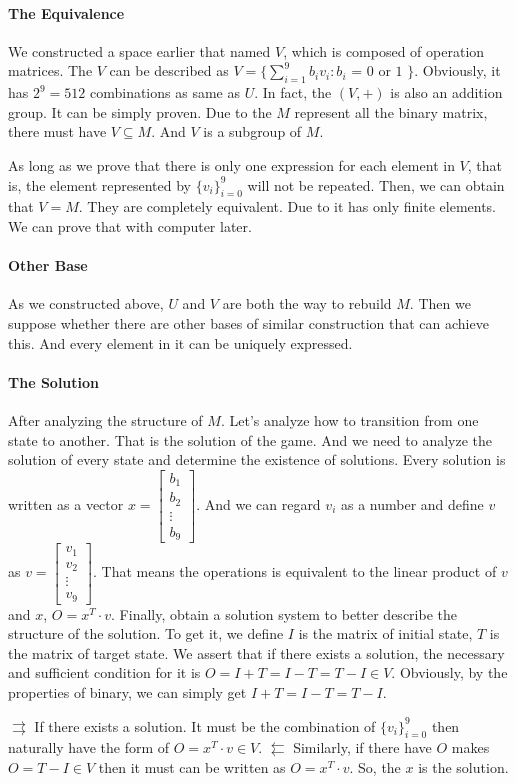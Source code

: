 \documentclass[
  manuscript=article,  %
  layout=preprint,  %
  year=20xx,
  volume=x,
]{extra/joas}
\begin{document}
\paragraph{The Equivalence} We constructed a space earlier that named $V$, which is composed of operation matrices.
The $V$ can be described as $V = \{ \sum_{i=1}^{9} b_i v_i:\text{$b_i$ = 0 or 1 } \}$. 
Obviously, it has $2^9 = 512$ combinations as same as $U$. 
In fact, the $(V, +)$ is also an addition group. It can be simply proven. 
Due to the $M$ represent all the binary matrix, there must have $V\subseteq  M$. 
And $V$ is a subgroup of $M$.
\par As long as we prove that there is only one expression for each element in $V$, 
that is, the element represented by $\{v_i\}_{i=0}^9$ will not be repeated. 
Then, we can obtain that $V = M$. They are completely equivalent. 
Due to it has only finite elements. We can prove that with computer later.

\paragraph{Other Base} As we constructed above, $U$ and $V$ are both the way to rebuild $M$. 
Then we suppose whether there are other bases of similar construction that can achieve this. 
And every element in it can be uniquely expressed. 

\paragraph{The Solution} After analyzing the structure of $M$. 
Let's analyze how to transition from one state to another. That is the solution of the game. 
And we need to analyze the solution of every state and determine the existence of solutions. 
Every solution is written as a vector $x = \begin{bmatrix} b_1 \\ b_2 \\ \vdots \\ b_9 \end{bmatrix}$. 
And we can regard $v_i$ as a number and define $v$ as $v = \begin{bmatrix} v_1 \\ v_2 \\ \vdots \\ v_9 \end{bmatrix}$. 
That means the operations is equivalent to the linear product of $v$ and $x$, $O = x^T\cdot v$.
Finally, obtain a solution system to better describe the structure of the solution. 
To get it, we define $I$ is the matrix of initial state, $T$ is the matrix of target state. 
We assert that if there exists a solution, the necessary and sufficient condition for it is 
$O = I + T = I - T = T - I \in V$. 
Obviously, by the properties of binary, we can simply get $I + T = I - T = T - I$. 
\par $\rightrightarrows$ If there exists a solution. It must be the combination of $\{v_i\}_{i=0}^9$ 
then naturally have the form of $O = x^T\cdot v \in V$.
$\leftleftarrows$ Similarly, if there have $O$ makes $O = T - I \in V$ then it must can be written as 
$O = x^T\cdot v$. So, the $x$ is the solution.
\end{document}
